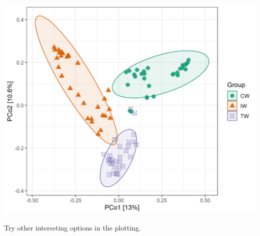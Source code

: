 \documentclass[
]{book}
\begin{document}
\begin{center}\includegraphics[width=650px]{Images/plot_ordination} \end{center}

Try other interesting options in the plotting.
\end{document}
